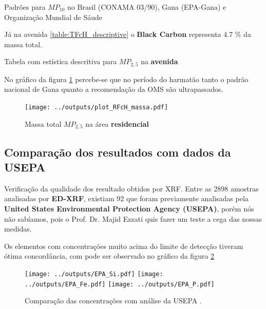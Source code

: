 \begin{table}[H]
  \centering
  \begin{scriptsize}
    
  \end{scriptsize}
  \caption{Padrões para $MP_{10}$ no Brasil (CONAMA 03/90), Gana (EPA-Gana) e 
          Organização Mundial de Sáude \label{table:pm10standards}}
\end{table}



Já na avenida \ref{table:TFcH_descriptive} o \textbf{Black Carbon} 
representa 4.7 \% da massa total.

\begin{table}[H]
  \centering
  \begin{scriptsize}
    
  \end{scriptsize}
  \caption{Tabela com estística descritiva para $MP_{2,5}$ na \textbf{avenida}
          \label{table:TFcH_descriptive}}
\end{table}

No gráfico da figura \ref{fig:plot_RFcH_massa} percebe-se que no período 
do harmatão tanto o padrão nacional de Gana quanto a recomendação da OMS 
são ultrapassados.

\begin{figure}[H]
\begin{center}
  \texttt{[image: ../outputs/plot\_RFcH\_massa.pdf]}
  \caption{Massa total $MP_{2,5}$ na área \textbf{residencial} \label{fig:plot_RFcH_massa}}
\end{center}
\end{figure}

\subsection{Comparação dos resultados com dados da USEPA}

Verificação da qualidade dos resultado obtidos por XRF.
Entre as 2898 amostras analisadas por \textbf{ED-XRF}, existiam 92 que foram 
previamente analisadas pela \textbf{United States Environmental Protection 
Agency (USEPA)}, porém nós não sabíamos, pois o Prof. Dr. Majid Ezzati quis 
fazer um teste a cega das nossas medidas. 

Os elementos com concentrações muito acima do limite de detecção tiveram ótima
concordância, com pode ser observado no gráfico da figura \ref{fig:epa} 

\begin{figure}[H]
  \centering
    \texttt{[image: ../outputs/EPA\_Si.pdf]}
    \texttt{[image: ../outputs/EPA\_Fe.pdf]}
    \texttt{[image: ../outputs/EPA\_P.pdf]}
  \caption{Comparação das concentrações com análise da USEPA \label{fig:epa}.}
\end{figure}
